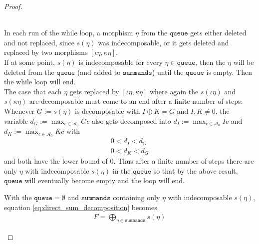 \begin{proof}
\begin{subproof}
\begin{subproof}\phantom{}\\
\noindent In each run of the while loop, a morphism $\eta$ from the $\mathtt{queue}$ gets either deleted and not replaced,
since $s(\eta)$ was indecomposable, or it gets deleted and replaced by two morphisms $[\iota\eta, \kappa\eta]$.\\
If at some point, $s(\eta)$ is indecomposable for every $\eta \in \mathtt{queue}$, then the $\eta$ will be deleted from the
$\mathtt{queue}$ (and added to $\mathtt{summands}$) until the $\mathtt{queue}$ is empty. Then the while loop will end.\\

\noindent The case that each $\eta$ gets replaced by $[\iota\eta, \kappa\eta]$ where again the $s(\iota\eta)$ and $s(\kappa\eta)$ are
decomposable must come to an end after a finite number of steps:\\

\noindent Whenever $G := s(\eta)$ is decomposable with $I \oplus K = G$ and $I, K \neq 0$, the variable
$d_{G} :=\max_{c \in \mathcal{A}_{0}} Gc$ also gets decomposed into $d_{I} := \max_{c \in \mathcal{A}_{0}} Ic$ and
$d_{K} := \max_{c \in \mathcal{A}_{0}} Kc$ with
\begin{align*}
0 < d_{I} < d_{G} \\
0 < d_{K} < d_{G}
\end{align*}
and both have the lower bound of $0$. Thus after a finite number of steps there are only $\eta$ with indecomposable $s(\eta)$ in the $\mathtt{queue}$
so that by the above result, $\mathtt{queue}$ will eventually become empty and the loop will end.
\end{subproof}

\noindent With the $\mathtt{queue} = \emptyset$ and $\mathtt{summands}$ containing only $\eta$ with indecomposable $s(\eta)$,
equation \eqref{eq:direct_sum_decomposition} becomes
\begin{align}
F = \bigoplus_{\eta \in \mathtt{summands}} s(\eta)
\end{align}
\end{subproof}

\end{proof}


